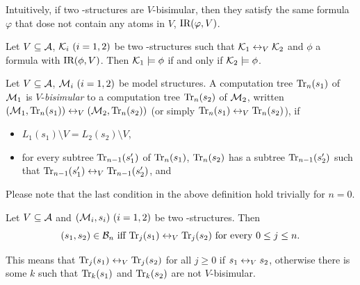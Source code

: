 \documentclass{article}
\begin{document}
Intuitively, if two \MPK-structures are $V$-bisimular, then they satisfy the same formula $\varphi$ that dose not contain any atoms in $V$, \ie $\textrm{IR}(\varphi, V)$.
\begin{theorem}\label{thm:V-bisimulation:EQ}
  Let $V\subseteq\cal A$, ${\cal K}_i~(i=1,2)$ be two \MPK-structures such that
  ${\cal K}_1\leftrightarrow_V{\cal K}_2$ and $\phi$ a formula with $\textrm{IR}(\phi,V)$. Then
  ${\cal K}_1\models\phi$ if and only if ${\cal K}_2\models\phi$.
\end{theorem}


Let $V\subseteq\cal A$, ${\cal M}_i~(i=1,2)$ be  model structures.
A computation tree $\textrm{Tr}_n(s_1)$ of ${\cal M}_1$ is $V$-{\em bisimular}
to a computation tree $\textrm{Tr}_n(s_2)$ of ${\cal M}_2$, written
$({\cal M}_1,\textrm{Tr}_n(s_1))\leftrightarrow_V({\cal M}_2,\textrm{Tr}_n(s_2))$ (or simply
$\textrm{Tr}_n(s_1)\leftrightarrow_V\textrm{Tr}_n(s_2)$), if %
\begin{itemize}
  \item $L_1(s_1)\setminus V=L_2(s_2)\setminus V$,
  \item for every subtree $\textrm{Tr}_{n-1}(s_1')$ of $\textrm{Tr}_n(s_1)$,
  $\textrm{Tr}_n(s_2)$ has a subtree $\textrm{Tr}_{n-1}(s_2')$ such that
  $\textrm{Tr}_{n-1}(s_1')\leftrightarrow_V\textrm{Tr}_{n-1}(s_2')$, and
\end{itemize}
Please note that the last condition in the above definition
hold trivially for $n=0$.

\begin{proposition}\label{B_to_T}
  Let $V\subseteq\cal A$ and $({\cal M}_i,s_i)~(i=1,2)$ be two \MPK-structures.
  Then
  \[(s_1,s_2)\in{\cal B}_n\mbox{ iff }
  \textrm{Tr}_j(s_1)\leftrightarrow_V\textrm{Tr}_j(s_2)\mbox{ for every $0\le j\le n$}.\]
\end{proposition}
This means that $\textrm{Tr}_j(s_1) \leftrightarrow_V \textrm{Tr}_j(s_2)$ for all $j \geq 0$ if $s_1 \leftrightarrow_V s_2$, otherwise there is some $k$ such that $\textrm{Tr}_k(s_1)$ and $\textrm{Tr}_k(s_2)$ are not $V$-bisimular.
\end{document}
